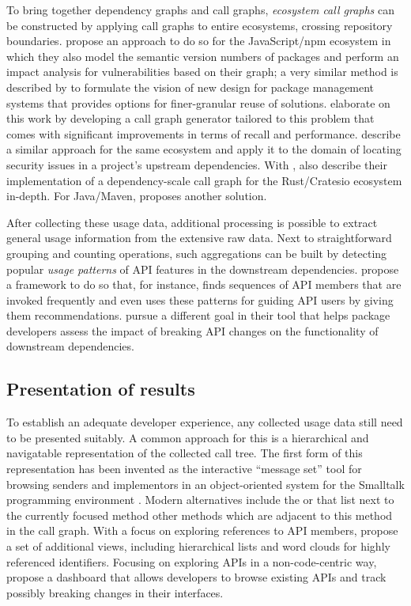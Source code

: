To bring together dependency graphs and call graphs, \emph{ecosystem call graphs} can be constructed by applying call graphs to entire ecosystems, crossing repository boundaries.
\citet{hejderup2018software} propose an approach to do so for the JavaScript/npm ecosystem in which they also model the semantic version numbers of packages and perform an impact analysis for vulnerabilities based on their graph; a very similar method is described by \citet{boldi2020fine} to formulate the vision of new design for package management systems that provides options for finer-granular reuse of solutions.
\citet{nielsen2021modular} elaborate on this work by developing a call graph generator tailored to this problem that comes with significant improvements in terms of recall and performance.
\citet{wang2020empirical} describe a similar approach for the same ecosystem and apply it to the domain of locating security issues in a project's upstream dependencies.
With , \citet{hejderup2021praezi} also describe their implementation of a dependency-scale call graph for the Rust/Cratesio ecosystem in-depth.
For Java/Maven, \citet{keshani2021scalable} proposes another solution.

After collecting these usage data, additional processing is possible to extract general usage information from the extensive raw data.
Next to straightforward grouping and counting operations, such aggregations can be built by detecting popular \emph{usage patterns} of API features in the downstream dependencies.
\citet{zhong2009mapo} propose a framework to do so that, for instance, finds sequences of API members that are invoked frequently and even uses these patterns for guiding API users by giving them recommendations.
\citet{hanam2019aiding} pursue a different goal in their tool that helps package developers assess the impact of breaking API changes on the functionality of downstream dependencies.

\subsection{Presentation of results}
\label{sec:related_work/presentation}

To establish an adequate developer experience, any collected usage data still need to be presented suitably.
A common approach for this is a hierarchical and navigatable representation of the collected call tree.
The first form of this representation has been invented as the interactive ``message set'' tool for browsing senders and implementors in an object-oriented system for the Smalltalk programming environment \citep[section~10.1f.]{goldberg1984smalltalk}.
Modern alternatives include the  \citep{karrer2011stacksplorer} or  \citep{kramer2012blaze} that list next to the currently focused method other methods which are adjacent to this method in the call graph.
With a focus on exploring references to API members, \citet{de2013multi} propose a set of additional views, including hierarchical lists and word clouds for highly referenced identifiers.
Focusing on exploring APIs in a non-code-centric way, \citet{hora2015apiwave} propose a dashboard that allows developers to browse existing APIs and track possibly breaking changes in their interfaces.
